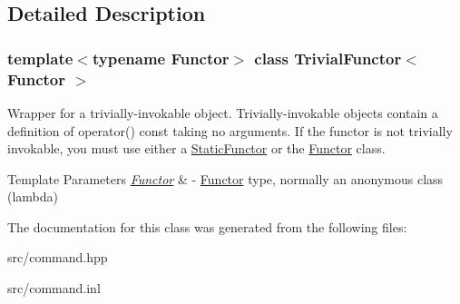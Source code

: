 \subsection{Detailed Description}
\subsubsection*{template$<$typename Functor$>$\newline
class Trivial\+Functor$<$ Functor $>$}

Wrapper for a trivially-\/invokable object. Trivially-\/invokable objects contain a definition of \textquotesingle{}operator() const\textquotesingle{} taking no arguments. If the functor is not trivially invokable, you must use either a \mbox{\hyperlink{class_static_functor}{Static\+Functor}} or the \mbox{\hyperlink{class_functor}{Functor}} class. 
\begin{DoxyTemplParams}{Template Parameters}
{\em \mbox{\hyperlink{class_functor}{Functor}}} & -\/ \mbox{\hyperlink{class_functor}{Functor}} type, normally an anonymous class (lambda) \\
\hline
\end{DoxyTemplParams}


The documentation for this class was generated from the following files\+:\begin{DoxyCompactItemize}
\item 
src/command.\+hpp\item 
src/command.\+inl\end{DoxyCompactItemize}
